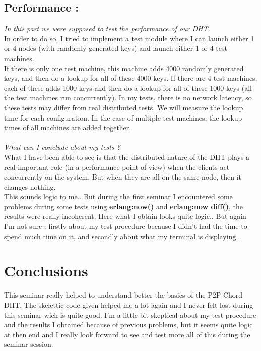 \documentclass[a4paper, 11pt]{article}
\begin{document}
\subsection{Performance :}

\textit{In this part we were supposed to test the performance of our DHT.}
\\
In order to do so, I tried to implement a test module where I can launch either 1 or 4 nodes (with randomly generated keys) and launch either 1 or 4 test machines. 
\\
If there is only one test machine, this machine adds 4000 randomly generated keys, and then do a lookup for all of these 4000 keys. If there are 4 test machines, each of these adds 1000 keys and then do a lookup for all of these 1000 keys (all the test machines run concurrently). In my tests, there is no network latency, so these tests may differ from real distributed tests. We will measure the lookup time for each configuration. In the case of multiple test machines, the lookup times of all machines are added together.
\\
\\
\textit{What can I conclude about my tests ?}
\\
What I have been able to see is that the distributed nature of the DHT plays a real important role (in a performance point of view) when the clients act concurrently on the system. But when they are all on the same node, then it changes nothing. \\
This sounds logic to me.. But during the first seminar I encountered some problems during some tests using \textbf{erlang:now()} and \textbf{erlang:now diff()}, the results were really incoherent. Here what I obtain looks quite logic.. But again I'm not sure : firstly about my test procedure because I didn't had the time to spend much time on it, and secondly about what my terminal is displaying...  

\section{Conclusions}

This seminar really helped to understand better the basics of the P2P Chord DHT. The skelettic code given helped me a lot again and I never felt lost during this seminar wich is quite good. I'm a little bit skeptical about my test procedure and the results I obtained because of previous problems, but it seems quite logic at then end and I really look forward to see and test more all of this during the seminar session.
\end{document}
